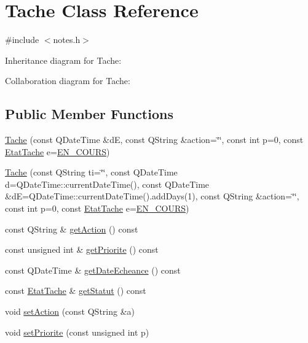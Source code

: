 \hypertarget{classTache}{}\section{Tache Class Reference}
\label{classTache}


{\ttfamily \#include $<$notes.\+h$>$}



Inheritance diagram for Tache\+:


Collaboration diagram for Tache\+:
\subsection*{Public Member Functions}
\begin{DoxyCompactItemize}
\item 
\hyperlink{classTache_ae226d0bfd8d10c6a0924f476c9939ba9}{Tache} (const Q\+Date\+Time \&dE, const Q\+String \&action=\char`\"{}\char`\"{}, const int p=0, const \hyperlink{notes_8h_a3134b3f30eabd82d809c2f22704d2408}{Etat\+Tache} e=\hyperlink{notes_8h_a3134b3f30eabd82d809c2f22704d2408a82d9921c9b44d1c2c7b5e169f28d309f}{E\+N\+\_\+\+C\+O\+U\+RS})
\item 
\hyperlink{classTache_a9d4747a28ec7ad98e58a217826e50cf1}{Tache} (const Q\+String ti=\char`\"{}\char`\"{}, const Q\+Date\+Time d=Q\+Date\+Time\+::current\+Date\+Time(), const Q\+Date\+Time \&dE=Q\+Date\+Time\+::current\+Date\+Time().add\+Days(1), const Q\+String \&action=\char`\"{}\char`\"{}, const int p=0, const \hyperlink{notes_8h_a3134b3f30eabd82d809c2f22704d2408}{Etat\+Tache} e=\hyperlink{notes_8h_a3134b3f30eabd82d809c2f22704d2408a82d9921c9b44d1c2c7b5e169f28d309f}{E\+N\+\_\+\+C\+O\+U\+RS})
\item 
const Q\+String \& \hyperlink{classTache_a8fe5c528aee5e1f5f720e9833cae27f5}{get\+Action} () const 
\item 
const unsigned int \& \hyperlink{classTache_af83b9288941da6e3031813c982ab0ae8}{get\+Priorite} () const 
\item 
const Q\+Date\+Time \& \hyperlink{classTache_a90b98eca131c7e2e38be14ef05f72d93}{get\+Date\+Echeance} () const 
\item 
const \hyperlink{notes_8h_a3134b3f30eabd82d809c2f22704d2408}{Etat\+Tache} \& \hyperlink{classTache_a797e2d40dce297a731ac2e0219922b5f}{get\+Statut} () const 
\item 
void \hyperlink{classTache_a8b7080efc2f5075567118e22853282b3}{set\+Action} (const Q\+String \&a)
\item 
void \hyperlink{classTache_a9653defcca491740923a4ae4e8c06029}{set\+Priorite} (const unsigned int p)

\end{DoxyCompactItemize}
